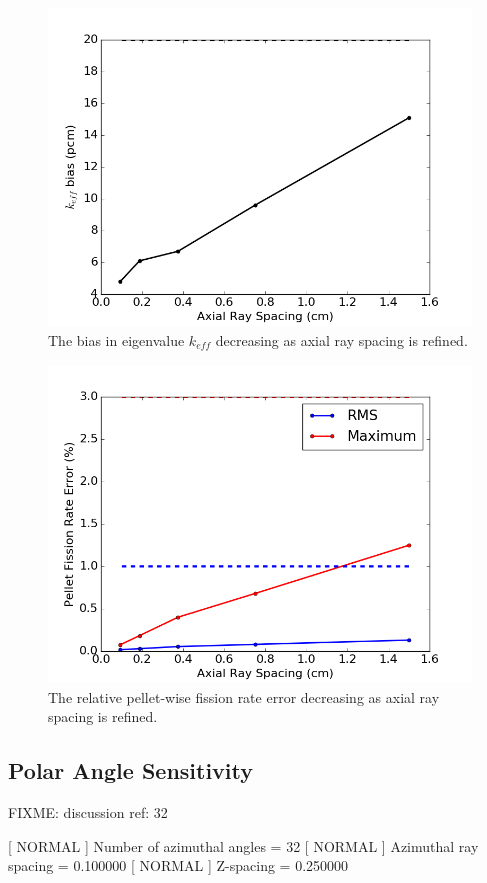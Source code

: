 \begin{figure}[h!]
	\centering
	\includegraphics[width=0.7\linewidth]{figures/results/sensitivity/z_spacing_pcm.png}
	\caption[]{The bias in eigenvalue $k_{\textit{eff}}$ decreasing as axial ray spacing is refined.}
	\label{fig:axial-rs-pcm}
\end{figure}
\begin{figure}[h!]
	\centering
	\includegraphics[width=0.7\linewidth]{figures/results/sensitivity/z_spacing_fr.png}
	\caption[]{The relative pellet-wise fission rate error decreasing as axial ray spacing is refined.}
	\label{fig:axial-rs-fr}
\end{figure}

\subsection{Polar Angle Sensitivity}

FIXME: discussion
ref: 32

[  NORMAL ]  Number of azimuthal angles = 32
[  NORMAL ]  Azimuthal ray spacing = 0.100000
[  NORMAL ]  Z-spacing = 0.250000

